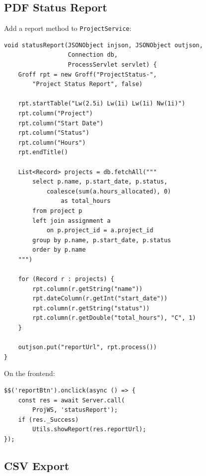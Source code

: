 \subsection{PDF Status Report}

Add a report method to \texttt{ProjectService}:

\begin{lstlisting}[style=groovy]
void statusReport(JSONObject injson, JSONObject outjson,
                  Connection db,
                  ProcessServlet servlet) {
    Groff rpt = new Groff("ProjectStatus-",
        "Project Status Report", false)

    rpt.startTable("Lw(2.5i) Lw(1i) Lw(1i) Nw(1i)")
    rpt.column("Project")
    rpt.column("Start Date")
    rpt.column("Status")
    rpt.column("Hours")
    rpt.endTitle()

    List<Record> projects = db.fetchAll("""
        select p.name, p.start_date, p.status,
            coalesce(sum(a.hours_allocated), 0)
                as total_hours
        from project p
        left join assignment a
            on p.project_id = a.project_id
        group by p.name, p.start_date, p.status
        order by p.name
    """)

    for (Record r : projects) {
        rpt.column(r.getString("name"))
        rpt.dateColumn(r.getInt("start_date"))
        rpt.column(r.getString("status"))
        rpt.column(r.getDouble("total_hours"), "C", 1)
    }

    outjson.put("reportUrl", rpt.process())
}
\end{lstlisting}

\noindent
On the frontend:

\begin{lstlisting}[style=javascript]
$$('reportBtn').onclick(async () => {
    const res = await Server.call(
        ProjWS, 'statusReport');
    if (res._Success)
        Utils.showReport(res.reportUrl);
});
\end{lstlisting}

\subsection{CSV Export}

